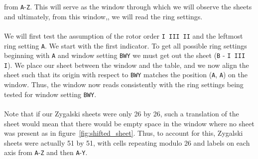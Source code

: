 from \texttt{A}-\texttt{Z}. This will serve as the window through
which we will observe the sheets and ultimately, from this window,,
we will read the ring settings. 
\\\\We will first test the assumption of
the rotor order \texttt{I III II} and the leftmost ring setting \texttt{A}.
We start with the first indicator. To get all possible ring
settings beginning with \texttt{A} and window setting \texttt{BWY} we
must get out the sheet (\texttt{B} - \texttt{I III I}). We place our
sheet between the window and the table, and we now align the sheet
such that its origin with respect to \texttt{BWY} matches the
position (\texttt{A}, \texttt{A}) on the window. Thus, the window now
reads consistently with the ring settings being tested for window
setting \texttt{BWY}.
\\\\Note that if our Zygalski sheets were only 26 by 26, such a
translation of the sheet would mean that there would be empty space
in the window where no sheet was present as in
figure~\ref{fig:shifted_sheet}. Thus, to account for this, Zygalski
sheets were actually 51 by 51, with cells repeating modulo 26 and
labels on each axis from \texttt{A}-\texttt{Z} and then \texttt{A}-\texttt{Y}.
